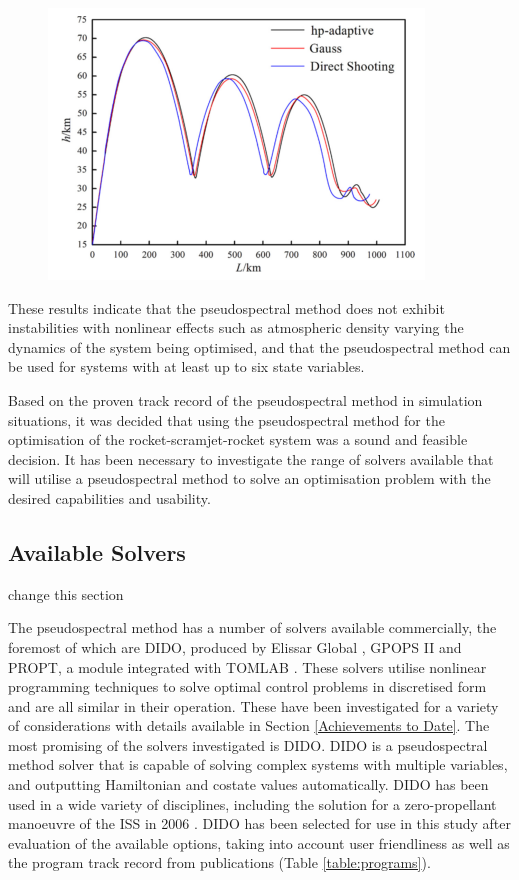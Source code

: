  \begin{figure}
\centering
\includegraphics[width=0.7\linewidth]{figures/2_literature-review/OptimisationMethodComparisonChai}
\caption{}
\label{fig:OptimisationMethodComparisonChai}
\end{figure}


These results indicate that the pseudospectral method does not exhibit instabilities with nonlinear effects such as atmospheric density varying the dynamics of the system being optimised, and that the pseudospectral method can be used for systems with at least up to six state variables.

Based on the proven track record of the pseudospectral method in simulation situations, it was decided that using the pseudospectral method for the optimisation of the rocket-scramjet-rocket system was a sound and feasible decision. It has been necessary to investigate the range of solvers available that will utilise a pseudospectral method to solve an optimisation problem with the desired capabilities and usability. 

\subsection{Available Solvers}
change this section

The pseudospectral method has a number of solvers available commercially, the foremost of which are DIDO, produced by Elissar Global \cite{Ross2002}, GPOPS II \cite{Rao2010} and PROPT, a module integrated with TOMLAB \cite{Rutquist2010}. These solvers utilise nonlinear programming techniques to solve optimal control problems in discretised form and are all similar in their operation. These have been investigated for a variety of considerations with details available in Section \ref{Achievements to Date}. The most promising of the solvers investigated is DIDO. DIDO is a pseudospectral method solver that is capable of solving complex systems with multiple variables, and outputting Hamiltonian and costate values automatically. DIDO has been used in a wide variety of disciplines, including the solution for a zero-propellant manoeuvre of the ISS in 2006 \cite{Bedrossian}. DIDO has been selected for use in this study after evaluation of the available options, taking into account user friendliness as well as the program track record from publications (Table \ref{table:programs}).


